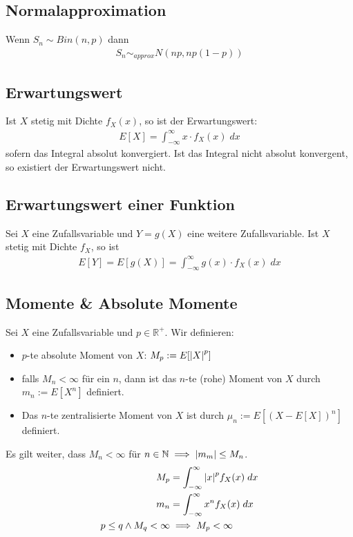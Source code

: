 \documentclass[8pt]{extarticle}
\newcommand{\N}{\mathbb{N}}
\newcommand{\R}{\mathbb{R}}
\begin{document}
\begin{multicols*}{3}
  \subsection*{Normalapproximation}
  Wenn $S_n \sim Bin(n, p)$ dann
  \begin{align*}
    S_n \sim_{approx} N(np, np(1-p))
  \end{align*}
  \subsection*{Erwartungswert}
  Ist $X$ stetig mit Dichte $f_X(x)$, so ist der Erwartungswert:
  \begin{align*}
    E[X] = \int_{-\infty}^\infty x \cdot f_X(x) \; dx
  \end{align*}
  sofern das Integral absolut konvergiert. Ist das Integral nicht
  absolut konvergent, so existiert der Erwartungswert nicht.
  \subsection*{Erwartungswert einer Funktion}
  Sei $X$ eine Zufallsvariable und $Y = g(X)$ eine weitere
  Zufallsvariable. Ist $X$ stetig mit Dichte $f_X$, so ist
  \begin{align*}
    E[Y] = E[g(X)] = \int_{-\infty}^\infty g(x) \cdot f_X(x) \; dx
  \end{align*}
  \subsection*{Momente \& Absolute Momente}
  Sei $X$ eine Zufallsvariable und $p \in \R^+$. Wir definieren:
  \begin{itemize}
    \item $p$-te absolute Moment von $X$: $M_p := E[\abs{X}^p]$
    \item falls $M_n < \infty$ für ein $n$, dann ist das $n$-te
          (rohe) Moment von $X$ durch $m_n := E[X^n]$ definiert.
    \item Das $n$-te zentralisierte Moment von $X$ ist
          durch $\mu_n := E[(X - E[X])^n]$ definiert.
  \end{itemize}
  Es gilt weiter, dass $M_n < \infty$ für $n \in \N \implies \abs{m_m} \leq M_n$.
  \begin{align*}
    M_p                         & = \int_{-\infty}^\infty \abs{x}^p f_X(x) \; dx \\
    m_n                         & = \int_{-\infty}^\infty x^n f_X(x) \; dx       \\
    p \leq q \land M_q < \infty & \implies M_p < \infty
  \end{align*}

\end{multicols*}
\end{document}
